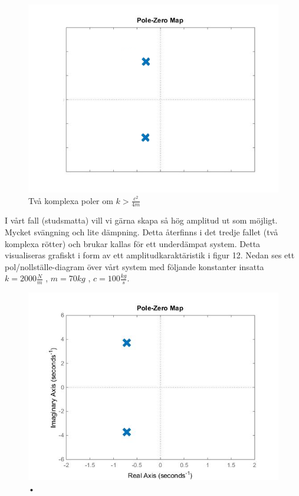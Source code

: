\documentclass[10pt,a4paper]{article}
\begin{document}
\begin{figure}
\begin{center}
\includegraphics[scale=0.3]{2komplexa}
\caption{Två komplexa poler om $k>\frac{c^2}{4m}$}
\end{center}
\end{figure}
\newpage


I vårt fall (studsmatta) vill vi gärna skapa så hög amplitud ut som möjligt. Mycket svängning och lite dämpning. Detta återfinns i det tredje fallet (två komplexa rötter) och brukar kallas för ett underdämpat system. Detta visualiseras grafiskt i form av ett amplitudkaraktäristik i figur 12. Nedan ses ett pol/nollställe-diagram över vårt system med följande konstanter insatta $k=2000\frac{N}{m}$ , $m=70kg$ , $c=100\frac{kg}{s}$.


\begin{figure}[h]
\begin{center}
\includegraphics[scale=0.5]{nolpol-diagram}
\caption{•}
\end{center}
\end{figure}
\end{document}
